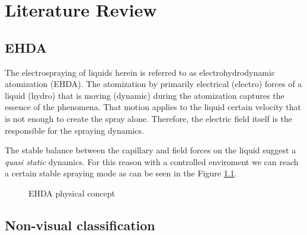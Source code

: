 \chapter{Literature Review}
\label{chap:lit_review}


\section{EHDA}
\label{sec:ehda_resume}

The electrospraying of liquids herein is referred to as electrohydrodynamic atomization (EHDA). The atomization by primarily electrical (electro) forces of a liquid (hydro) that is moving (dynamic) during the atomization captures the essence of the phenomena.\cite{Grace}
That motion applies to the liquid certain velocity that is not enough to create the spray alone. Therefore, the electric field itself is the responsible for the spraying dynamics.\cite{prunet}

The stable balance between the capillary and field forces on the liquid suggest a \emph{quasi static} dynamics.
For this reason with a controlled enviroment we can reach a certain stable spraying mode as can be seen in the Figure \ref{fig:ehda_setup_ex2}.

\begin{figure}[H]
  \centering
  \caption{EHDA physical concept \cite{Gabriel}}
  \label{fig:ehda_setup_ex2}
\end{figure}


\section{Non-visual classification}
\label{sec:non-visual-classification}

